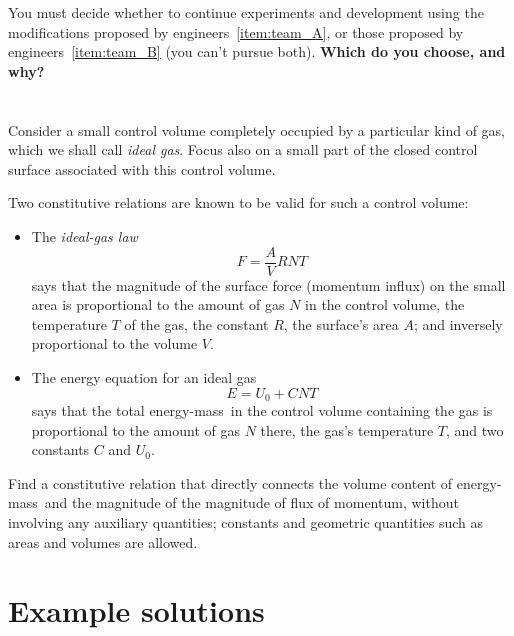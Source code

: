 \documentclass[a4paper,12pt,%
onecolumn,oneside,%
british%
]{memoir}
\newcommand{\addsec}[1]{\section*{#1}\addcontentsline{toc}{section}{#1}}
\renewcommand*{\|}[1][]{\nonscript\:#1\vert\nonscript\:\mathopen{}}
\newcommand*{\energym}{energy-mass}
\newcommand*{\yN}{N}
\newcommand*{\yE}{E}
\newcommand*{\yU}{U}
\newcommand*{\yT}{T}%
\begin{document}
You must decide whether to continue experiments and development using the modifications proposed by engineers~\ref{item:team_A}, or those proposed by engineers~\ref{item:team_B} (you can't pursue both). \textbf{Which do you choose, and why?}


\section{}
\label{sec:ideal_gas_const}
Consider a small control volume completely occupied by a particular kind of gas, which we shall call \emph{ideal gas}. Focus also on a small part of the closed control surface associated with this control volume.

Two constitutive relations are known to be valid for such a control volume:
\begin{itemize}
\item The \emph{ideal-gas law}
  \begin{equation*}
    F = \frac{A}{V} R \yN \yT
  \end{equation*}
says that the magnitude of the surface force (momentum influx) on the small area is proportional to the amount of gas $\yN$ in the control volume, the temperature $\yT$ of the gas, the constant $R$, the surface's area $A$; and inversely proportional to the volume $V$.

\item The energy equation for an ideal gas
  \begin{equation*}
    \yE = \yU_{0} + C \yN \yT
  \end{equation*}
  says that the total \energym\ in the control volume containing the gas is proportional to the amount of gas $\yN$ there, the gas's temperature $\yT$, and two constants $C$ and $\yU_{0}$.
\end{itemize}

Find a constitutive relation that directly connects the volume content of \energym\ and the magnitude of the magnitude of flux of momentum, without involving any auxiliary quantities; constants and geometric quantities such as areas and volumes are allowed.

\section{}
\label{sec:wave_eq}



\clearpage
\addsec{Example solutions}
\end{document}

